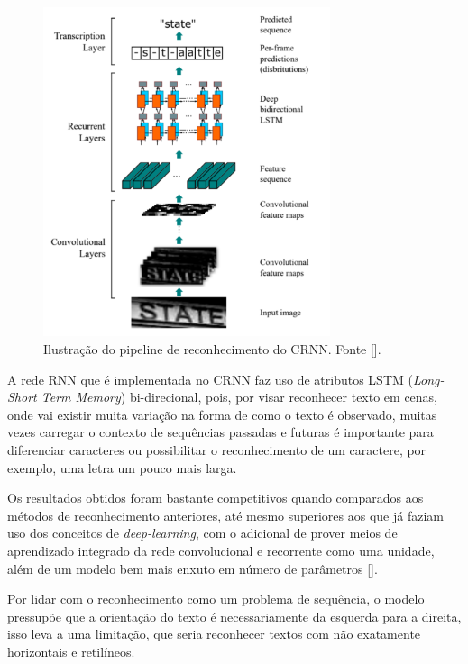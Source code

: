 \begin{figure}
    \centering
    \includegraphics[width=0.75\textwidth]{figs/crnn-pipeline.png}
    \caption{Ilustração do pipeline de reconhecimento do CRNN. Fonte [].}
    \label{fig:crnn_pipeline}
\end{figure}

A rede RNN que é implementada no CRNN faz uso de atributos LSTM (\textit{Long-Short Term Memory}) bi-direcional, pois, por visar reconhecer texto em cenas, onde vai existir muita variação na forma de como o texto é observado, muitas vezes carregar o contexto de sequências passadas e futuras é importante para diferenciar caracteres ou possibilitar o reconhecimento de um caractere, por exemplo, uma letra um pouco mais larga.

Os resultados obtidos foram bastante competitivos quando comparados aos métodos de reconhecimento anteriores, até mesmo superiores aos que já faziam uso dos conceitos de \textit{deep-learning}, com o adicional de prover meios de aprendizado integrado da rede convolucional e recorrente como uma unidade, além de um modelo bem mais enxuto em número de parâmetros [].

Por lidar com o reconhecimento como um problema de sequência, o modelo pressupõe que a orientação do texto é necessariamente da esquerda para a direita, isso leva a uma limitação, que seria reconhecer textos com não exatamente horizontais e retilíneos.

